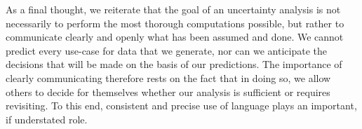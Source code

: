 As a final thought, we reiterate that the goal of an uncertainty analysis is not necessarily to perform the most thorough computations possible, but rather to communicate clearly and openly what has been assumed and done.  We cannot predict every use-case for data that we generate, nor can we anticipate the decisions that will be made on the basis of our predictions.  The importance of clearly communicating therefore rests on the fact that in doing so, we allow others to decide for themselves whether our analysis is sufficient or requires revisiting.  To this end, consistent and precise use of language plays an important, if understated role.
